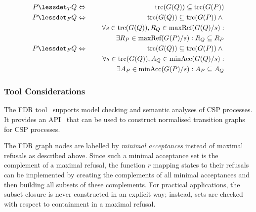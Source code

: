 \begin{lemma}
\label{lemma:tgtrcref}
\begin{eqnarray}
P \lessdet_T Q & \Leftrightarrow & \trc(G(Q)) \subseteq\trc(G(P))
\label{eq:trcrefa}
\\
\label{eq:failrefa}
P \lessdet_F Q & \Leftrightarrow & \trc(G(Q)) \subseteq\trc(G(P)) \wedge {}
\\ & & \forall s\in\trc(G(Q)), R_Q\in\maxrefs(G(Q)/s): 
\\ & & \tabd
\exists R_P\in\maxrefs(G(P)/s): R_Q\subseteq R_P
\\
\label{eq:failrefb}
P \lessdet_F Q & \Leftrightarrow & \trc(G(Q)) \subseteq\trc(G(P)) \wedge {}
\\ & & \forall s\in\trc(G(Q)), A_Q\in\minaccs(G(Q)/s):
\\ & & \tabd
\exists A_P\in\minaccs(G(P)/s): A_P\subseteq A_Q
\end{eqnarray}
\end{lemma}


\subsubsection*{Tool Considerations}
The FDR tool~\cite{fdr} supports model checking and semantic analyses of CSP
processes. It provides an API~\cite{fdrmanual} that can be used to construct
normalised transition graphs for CSP processes.

The FDR graph nodes are labelled by \emph{minimal acceptances} instead of
maximal refusals as described above. Since such a minimal acceptance set is
the complement of a maximal refusal, the function $r$ mapping states to their
refusals can be implemented by creating the complements of all minimal
acceptances and then building all subsets of these complements. For practical
applications, the subset closure is never constructed in an explicit way;
instead, sets are checked with respect to containment in a maximal refusal.

%



